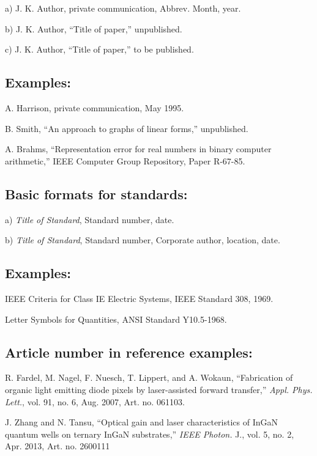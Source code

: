 \documentclass[journal]{IEEEtran}
\begin{document}
a) J. K. Author, private communication, Abbrev. Month, year.

b) J. K. Author, ``Title of paper,'' unpublished.

c) J. K. Author, ``Title of paper,'' to be published.

\subsection*{Examples:}

\begin{thebibliography}{34}
\setcounter{enumiv}{26}

\bibitem{}A. Harrison, private communication, May 1995.

\bibitem{}B. Smith, ``An approach to graphs of linear forms,'' unpublished.

\bibitem{}A. Brahms, ``Representation error for real numbers in binary computer arithmetic,'' IEEE Computer Group Repository, Paper R-67-85.
\end{thebibliography}

\subsection*{Basic formats for standards:}

a) {\em Title of Standard}, Standard number, date.

b) {\em Title of Standard}, Standard number, Corporate author, location, date.

\subsection*{Examples:}

\begin{thebibliography}{34}
\setcounter{enumiv}{29}


\bibitem{}IEEE Criteria for Class IE Electric Systems, IEEE Standard 308, 1969.

\bibitem{} Letter Symbols for Quantities, ANSI Standard Y10.5-1968.
\end{thebibliography}

\subsection*{Article number in reference examples:}

\begin{thebibliography}{34}
\setcounter{enumiv}{31}

\bibitem{}R. Fardel, M. Nagel, F. Nuesch, T. Lippert, and A. Wokaun, ``Fabrication of organic light emitting diode pixels by laser-assisted forward transfer,'' {\em Appl. Phys. Lett.}, vol. 91, no. 6, Aug. 2007, Art. no. 061103. 

\bibitem{} J. Zhang and N. Tansu, ``Optical gain and laser characteristics of InGaN quantum wells on ternary InGaN substrates,'' {\em IEEE Photon.} J., vol. 5, no. 2, Apr. 2013, Art. no. 2600111
\end{thebibliography}
\end{document}
